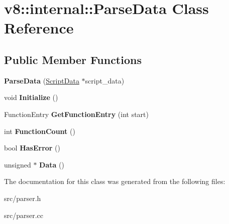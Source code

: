 \hypertarget{classv8_1_1internal_1_1_parse_data}{}\section{v8\+:\+:internal\+:\+:Parse\+Data Class Reference}
\label{classv8_1_1internal_1_1_parse_data}
\subsection*{Public Member Functions}
\begin{DoxyCompactItemize}
\item 
\hypertarget{classv8_1_1internal_1_1_parse_data_afc234dfebd4a8dd3634d00c7a92ca17e}{}{\bfseries Parse\+Data} (\hyperlink{classv8_1_1internal_1_1_script_data}{Script\+Data} $\ast$script\+\_\+data)\label{classv8_1_1internal_1_1_parse_data_afc234dfebd4a8dd3634d00c7a92ca17e}

\item 
\hypertarget{classv8_1_1internal_1_1_parse_data_ab882f568019e30ca80b6b42f17997e40}{}void {\bfseries Initialize} ()\label{classv8_1_1internal_1_1_parse_data_ab882f568019e30ca80b6b42f17997e40}

\item 
\hypertarget{classv8_1_1internal_1_1_parse_data_abd9155d674f8b2eea772140c913f1a6b}{}Function\+Entry {\bfseries Get\+Function\+Entry} (int start)\label{classv8_1_1internal_1_1_parse_data_abd9155d674f8b2eea772140c913f1a6b}

\item 
\hypertarget{classv8_1_1internal_1_1_parse_data_aea4434984041962893f383394c63b551}{}int {\bfseries Function\+Count} ()\label{classv8_1_1internal_1_1_parse_data_aea4434984041962893f383394c63b551}

\item 
\hypertarget{classv8_1_1internal_1_1_parse_data_a6a3886d7d418beea19699e3579a37083}{}bool {\bfseries Has\+Error} ()\label{classv8_1_1internal_1_1_parse_data_a6a3886d7d418beea19699e3579a37083}

\item 
\hypertarget{classv8_1_1internal_1_1_parse_data_ab6393ae557cfea7ba7cb75fdc82965cb}{}unsigned $\ast$ {\bfseries Data} ()\label{classv8_1_1internal_1_1_parse_data_ab6393ae557cfea7ba7cb75fdc82965cb}

\end{DoxyCompactItemize}


The documentation for this class was generated from the following files\+:\begin{DoxyCompactItemize}
\item 
src/parser.\+h\item 
src/parser.\+cc\end{DoxyCompactItemize}
